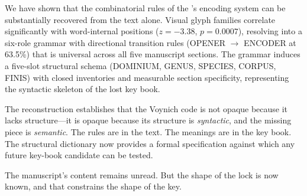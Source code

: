 We have shown that the combinatorial rules of the \vms's encoding
system can be substantially recovered from the text alone. Visual
glyph families correlate significantly with word-internal positions
($z = -3.38$, $p = 0.0007$), resolving into a six-role grammar with
directional transition rules (OPENER $\to$ ENCODER at 63.5\%) that
is universal across all five manuscript sections. The grammar induces
a five-slot structural schema (DOMINIUM, GENUS, SPECIES, CORPUS,
FINIS) with closed inventories and measurable section specificity,
representing the syntactic skeleton of the lost key book.

The reconstruction establishes that the Voynich code is not
opaque because it lacks structure---it is opaque because its structure
is \emph{syntactic}, and the missing piece is \emph{semantic}. The
rules are in the text. The meanings are in the key book. The
structural dictionary now provides a formal specification against
which any future key-book candidate can be tested.

The manuscript's content remains unread. But the shape of the lock
is now known, and that constrains the shape of the key.
